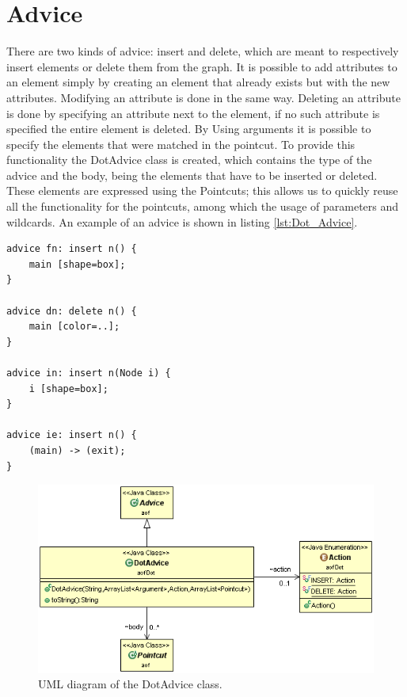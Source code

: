 \documentclass[a4paper]{report}
\begin{document}
\section{Advice}
There are two kinds of advice: insert and delete, which are meant to respectively insert elements or delete them from the graph. It is possible to add attributes to an element simply by creating an element that already exists but with the new attributes. Modifying an attribute is done in the same way. Deleting an attribute is done by specifying an attribute next to the element, if no such attribute is specified the entire element is deleted. By Using arguments it is possible to specify the elements that were matched in the pointcut. To provide this functionality the DotAdvice class is created, which contains the type of the advice and the body, being the elements that have to be inserted or deleted. These elements are expressed using the Pointcuts; this allows us to quickly reuse all the functionality for the pointcuts, among which the usage of parameters and wildcards. An example of an advice is shown in listing \ref{lst:Dot_Advice}.
\begin{lstlisting}[caption=Some examples of advice., label=lst:Dot_Advice]
advice fn: insert n() {
	main [shape=box];
}

advice dn: delete n() {
	main [color=..];
}

advice in: insert n(Node i) {
	i [shape=box];
}

advice ie: insert n() {
	(main) -> (exit);
}
\end{lstlisting}
\begin{figure}
\centering
\includegraphics[scale=0.6]{images/AOFDot/DotAdvice.png}
\caption{UML diagram of the DotAdvice class.}
\label{fig:DotAdvice}
\end{figure}
\end{document}
